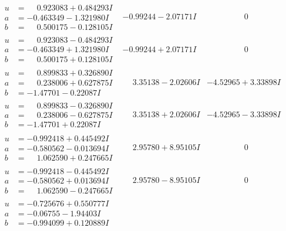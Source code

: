 \documentclass[1p]{elsarticle_modified}
\theoremstyle{definition}
\begin{document}
$$\begin{array}{c|c|c}
\begin{aligned}
u &= \phantom{-}0.923083 + 0.484293 I \\
a &= -0.463349 - 1.321980 I \\
b &= \phantom{-}0.500175 - 0.128105 I\end{aligned}
 & -0.99244 - 2.07171 I & \phantom{-0.000000 } 0 \\ \hline\begin{aligned}
u &= \phantom{-}0.923083 - 0.484293 I \\
a &= -0.463349 + 1.321980 I \\
b &= \phantom{-}0.500175 + 0.128105 I\end{aligned}
 & -0.99244 + 2.07171 I & \phantom{-0.000000 } 0 \\ \hline\begin{aligned}
u &= \phantom{-}0.899833 + 0.326890 I \\
a &= \phantom{-}0.238006 + 0.627875 I \\
b &= -1.47701 - 0.22087 I\end{aligned}
 & \phantom{-}3.35138 - 2.02606 I & -4.52965 + 3.33898 I \\ \hline\begin{aligned}
u &= \phantom{-}0.899833 - 0.326890 I \\
a &= \phantom{-}0.238006 - 0.627875 I \\
b &= -1.47701 + 0.22087 I\end{aligned}
 & \phantom{-}3.35138 + 2.02606 I & -4.52965 - 3.33898 I \\ \hline\begin{aligned}
u &= -0.992418 + 0.445492 I \\
a &= -0.580562 - 0.013694 I \\
b &= \phantom{-}1.062590 + 0.247665 I\end{aligned}
 & \phantom{-}2.95780 + 8.95105 I & \phantom{-0.000000 } 0 \\ \hline\begin{aligned}
u &= -0.992418 - 0.445492 I \\
a &= -0.580562 + 0.013694 I \\
b &= \phantom{-}1.062590 - 0.247665 I\end{aligned}
 & \phantom{-}2.95780 - 8.95105 I & \phantom{-0.000000 } 0 \\ \hline\begin{aligned}
u &= -0.725676 + 0.550777 I \\
a &= -0.06755 - 1.94403 I \\
b &= -0.994099 + 0.120889 I\end{aligned}

\end{array}$$
\end{document}
